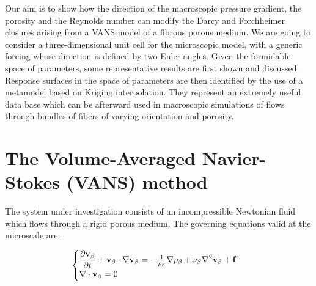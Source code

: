 Our aim is to show how the direction of the macroscopic pressure gradient, the porosity and the Reynolds number can 
modify the Darcy and Forchheimer closures arising from a VANS model of a fibrous porous medium. We are going to consider a three-dimensional 
unit cell for the microscopic model, with a generic forcing 
whose direction is defined by two Euler angles. Given the formidable space of parameters, some representative results are first
shown and discussed. Response surfaces in the space of parameters are then identified by the use of a metamodel based on Kriging 
interpolation.
They represent an extremely useful data base which can be afterward used in macroscopic simulations of 
flows through bundles of fibers of varying orientation and porosity.


\newpage


\section{The Volume-Averaged Navier-Stokes (VANS) method}

\label{sec:2ch4}

%
%
%
%
The system under investigation consists of an incompressible Newtonian fluid which flows through a rigid porous medium. The governing equations valid at the microscale are:

\begin{eqnarray*}
	\begin{cases}
\dfrac{\partial \textbf{v}_{\beta}}{\partial t} + \textbf{v}_{\beta} \cdot \nabla \textbf{v}_{\beta} = -\frac{1}{\rho_{\beta}} \nabla p_{\beta} + \nu_{\beta} \nabla^2  \textbf{v}_{\beta}  + \mathbf{f} \\
\nabla \cdot \textbf{v}_{\beta} = 0 
	\end{cases}
\label{eq:ns_f}
\end{eqnarray*}

